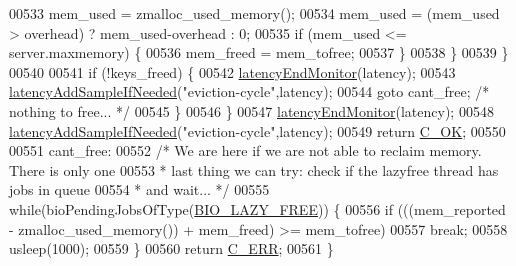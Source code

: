 \begin{DoxyCode}
00533                 mem\_used = zmalloc\_used\_memory();
00534                 mem\_used = (mem\_used > overhead) ? mem\_used-overhead : 0;
00535                 \textcolor{keywordflow}{if} (mem\_used <= server.maxmemory) \{
00536                     mem\_freed = mem\_tofree;
00537                 \}
00538             \}
00539         \}
00540 
00541         \textcolor{keywordflow}{if} (!keys\_freed) \{
00542             \hyperlink{latency_8h_a88461aee20da0a648fe3332b5f068df7}{latencyEndMonitor}(latency);
00543             \hyperlink{latency_8h_a77922ab34035890c90f98831a9071359}{latencyAddSampleIfNeeded}(\textcolor{stringliteral}{"eviction-cycle"},latency);
00544             \textcolor{keywordflow}{goto} cant\_free; \textcolor{comment}{/* nothing to free... */}
00545         \}
00546     \}
00547     \hyperlink{latency_8h_a88461aee20da0a648fe3332b5f068df7}{latencyEndMonitor}(latency);
00548     \hyperlink{latency_8h_a77922ab34035890c90f98831a9071359}{latencyAddSampleIfNeeded}(\textcolor{stringliteral}{"eviction-cycle"},latency);
00549     \textcolor{keywordflow}{return} \hyperlink{server_8h_a303769ef1065076e68731584e758d3e1}{C\_OK};
00550 
00551 cant\_free:
00552     \textcolor{comment}{/* We are here if we are not able to reclaim memory. There is only one}
00553 \textcolor{comment}{     * last thing we can try: check if the lazyfree thread has jobs in queue}
00554 \textcolor{comment}{     * and wait... */}
00555     \textcolor{keywordflow}{while}(bioPendingJobsOfType(\hyperlink{bio_8h_afdc82658b2e29c63afcdb2e808b8a510}{BIO\_LAZY\_FREE})) \{
00556         \textcolor{keywordflow}{if} (((mem\_reported - zmalloc\_used\_memory()) + mem\_freed) >= mem\_tofree)
00557             \textcolor{keywordflow}{break};
00558         usleep(1000);
00559     \}
00560     \textcolor{keywordflow}{return} \hyperlink{server_8h_af98ac28d5f4d23d7ed5985188e6fb7d1}{C\_ERR};
00561 \}
\end{DoxyCode}

